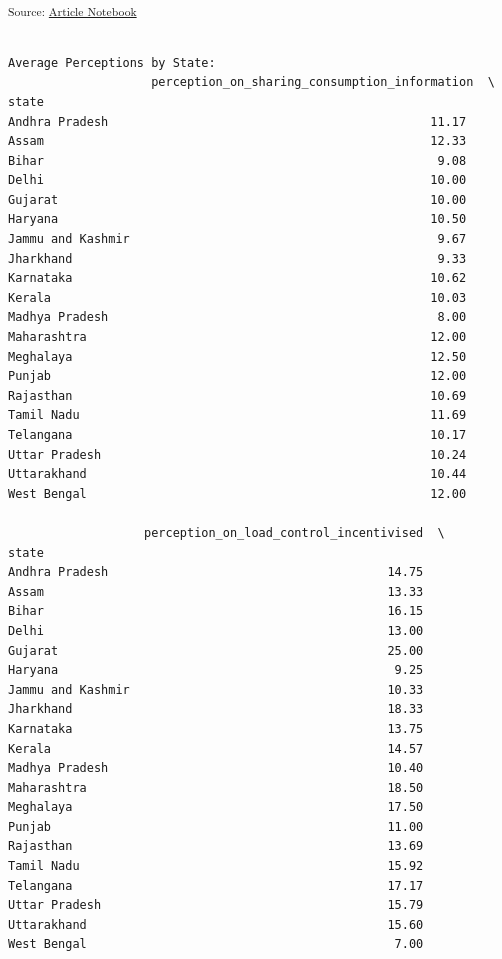 \documentclass[
  letterpaper,
  DIV=11,
  numbers=noendperiod]{scrartcl}
\begin{document}
\textsubscript{Source:
\href{https://sijuswamyresearch.github.io/SM-project/index-preview.html}{Article
Notebook}}

\begin{verbatim}

Average Perceptions by State:
                    perception_on_sharing_consumption_information  \
state                                                              
Andhra Pradesh                                             11.17   
Assam                                                      12.33   
Bihar                                                       9.08   
Delhi                                                      10.00   
Gujarat                                                    10.00   
Haryana                                                    10.50   
Jammu and Kashmir                                           9.67   
Jharkhand                                                   9.33   
Karnataka                                                  10.62   
Kerala                                                     10.03   
Madhya Pradesh                                              8.00   
Maharashtra                                                12.00   
Meghalaya                                                  12.50   
Punjab                                                     12.00   
Rajasthan                                                  10.69   
Tamil Nadu                                                 11.69   
Telangana                                                  10.17   
Uttar Pradesh                                              10.24   
Uttarakhand                                                10.44   
West Bengal                                                12.00   

                   perception_on_load_control_incentivised  \
state                                                        
Andhra Pradesh                                       14.75   
Assam                                                13.33   
Bihar                                                16.15   
Delhi                                                13.00   
Gujarat                                              25.00   
Haryana                                               9.25   
Jammu and Kashmir                                    10.33   
Jharkhand                                            18.33   
Karnataka                                            13.75   
Kerala                                               14.57   
Madhya Pradesh                                       10.40   
Maharashtra                                          18.50   
Meghalaya                                            17.50   
Punjab                                               11.00   
Rajasthan                                            13.69   
Tamil Nadu                                           15.92   
Telangana                                            17.17   
Uttar Pradesh                                        15.79   
Uttarakhand                                          15.60   
West Bengal                                           7.00   


\end{verbatim}
\end{document}
